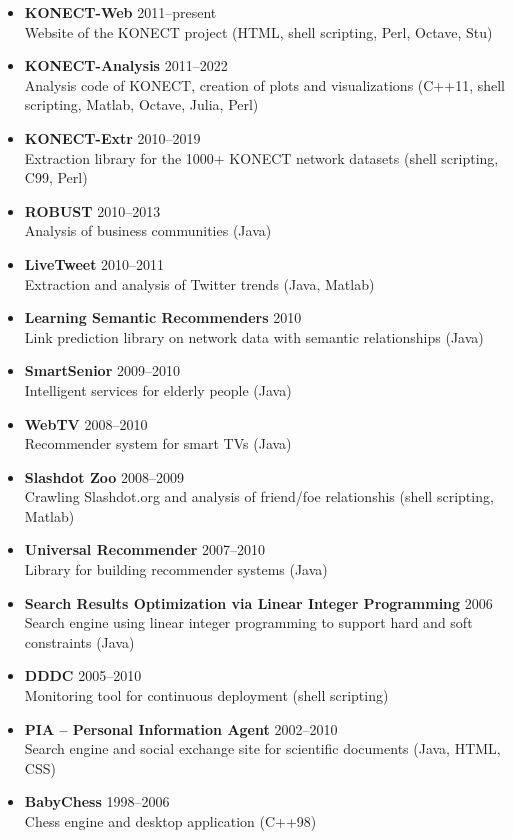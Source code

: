 \documentclass[line,mm]{res}
\newcounter{x}
\newcounter{y}
\newcounter{z}
\begin{document}
\begin{resume}
\begin{itemize}
  Build system for large data analysis projects (C++14)
\item \textbf{KONECT-Web} \hfill 2011--present \\
  Website of the KONECT project (HTML, shell scripting, Perl, Octave, Stu)
\item \textbf{KONECT-Analysis} \hfill 2011--2022 \\
  Analysis code of KONECT, creation of plots and visualizations (C++11, shell
  scripting, Matlab, Octave, Julia, Perl)
\item \textbf{KONECT-Extr} \hfill 2010--2019 \\
  Extraction library for the 1000+ KONECT network datasets (shell scripting, C99,
  Perl)
\item \textbf{ROBUST} \hfill 2010--2013 \\
  Analysis of business communities (Java)
\item \textbf{LiveTweet} \hfill 2010--2011 \\
  Extraction and analysis of Twitter trends (Java, Matlab)
\item \textbf{Learning Semantic Recommenders} \hfill 2010 \\
  Link prediction library on network data with semantic relationships (Java)
\item \textbf{SmartSenior} \hfill 2009--2010 \\
  Intelligent services for elderly people (Java)
\item \textbf{WebTV} \hfill 2008--2010 \\
  Recommender system for smart TVs (Java)
\item \textbf{Slashdot Zoo} \hfill 2008--2009 \\
  Crawling Slashdot.org and analysis of friend/foe relationshis (shell
  scripting, Matlab)
\item \textbf{Universal Recommender} \hfill 2007--2010 \\
  Library for building recommender systems (Java)
\item \textbf{Search Results Optimization via Linear Integer Programming} \hfill 2006 \\
  Search engine using linear integer programming to support hard and soft
  constraints (Java)
\item \textbf{DDDC} \hfill 2005--2010 \\
  Monitoring tool for continuous deployment (shell scripting)
\item \textbf{PIA -- Personal Information Agent} \hfill 2002--2010 \\
  Search engine and social exchange site for scientific documents (Java, HTML,
  CSS)
\item \textbf{BabyChess} \hfill 1998--2006 \\
  Chess engine and desktop application (C++98)
\end{itemize}


\end{resume}
\end{document}

